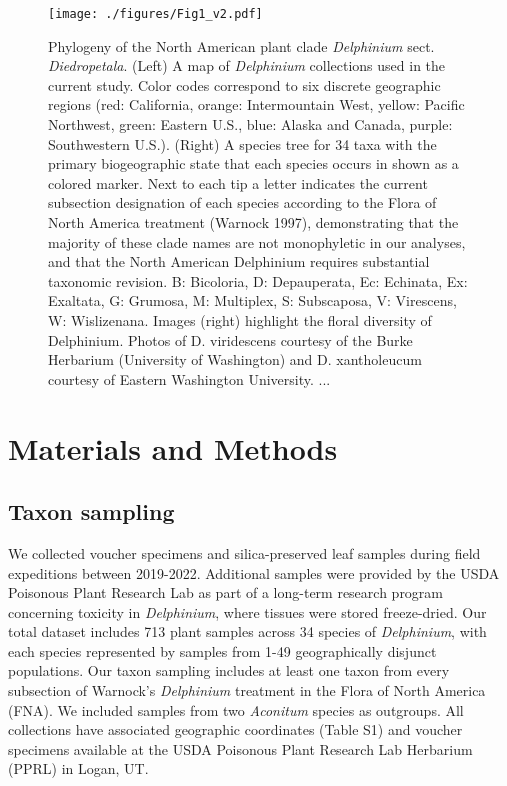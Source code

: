 \documentclass[11pt]{article}
\begin{document}
\begin{figure}[t!]
	\centering
	\texttt{[image: ./figures/Fig1\_v2.pdf]}	
	\caption{
	Phylogeny of the North American plant clade \emph{Delphinium} sect. 
	\emph{Diedropetala}.
	(Left) A map of \emph{Delphinium} collections used in the current study.
	Color codes correspond to six discrete geographic regions 
	(red: California, orange: Intermountain West, yellow: Pacific Northwest, 
	green: Eastern U.S., blue: Alaska and Canada, purple: Southwestern U.S.). 
	(Right) A species tree for 34 taxa with the primary biogeographic state
	that each species occurs in shown as a colored marker. 
	Next to each tip a letter indicates the current subsection designation of each species according to the Flora of North America treatment (Warnock 1997), demonstrating that the majority of these clade names are not monophyletic in our analyses, and that the North American Delphinium requires substantial taxonomic revision. B: Bicoloria, D: Depauperata, Ec: Echinata, Ex: Exaltata, G: Grumosa, M: Multiplex, S: Subscaposa, V: Virescens, W: Wislizenana. Images (right) highlight the floral diversity of Delphinium. Photos of D. viridescens courtesy of the Burke Herbarium (University of Washington) and D. xantholeucum courtesy of Eastern Washington University.
	...
	}
	\label{fig:1}
\end{figure}



\section{Materials and Methods}

\subsection{Taxon sampling}
We collected voucher specimens and silica-preserved leaf samples during field expeditions
between 2019-2022. Additional samples were provided by the USDA Poisonous Plant Research
Lab as part of a long-term research program concerning toxicity in \emph{Delphinium}, where
tissues were stored freeze-dried. 
Our total dataset includes 713 plant samples across 34 species of \emph{Delphinium},
with each species represented by samples from 1-49 geographically disjunct populations.
Our taxon sampling includes at least one taxon from every subsection of Warnock’s 
\emph{Delphinium} treatment in the Flora of North America (FNA). 
% 
We included samples from two \emph{Aconitum} species as outgroups.
All collections have associated geographic coordinates (Table S1) and voucher 
specimens available at the USDA Poisonous Plant Research Lab Herbarium (PPRL)
in Logan, UT.
\end{document}
